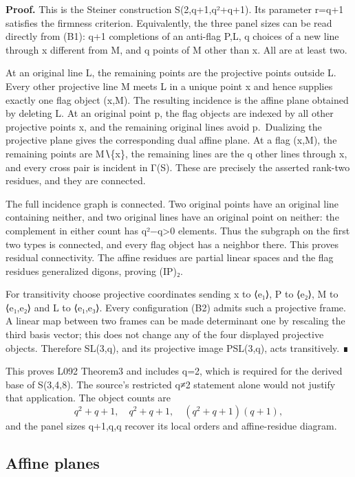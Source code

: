 \textbf{Proof.} This is the Steiner construction S(2,q+1,q²+q+1). Its
parameter r=q+1 satisfies the firmness criterion. Equivalently, the
three panel sizes can be read directly from (B1): q+1 completions of an
anti-flag P,L, q choices of a new line through x different from M, and q
points of M other than x. All are at least two.

At an original line L, the remaining points are the projective points
outside L. Every other projective line M meets L in a unique point x and
hence supplies exactly one flag object (x,M). The resulting incidence is
the affine plane obtained by deleting L. At an original point p, the
flag objects are indexed by all other projective points x, and the
remaining original lines avoid p.~Dualizing the projective plane gives
the corresponding dual affine plane. At a flag (x,M), the remaining
points are M∖\{x\}, the remaining lines are the q other lines through x,
and every cross pair is incident in Γ(S). These are precisely the
asserted rank-two residues, and they are connected.

The full incidence graph is connected. Two original points have an
original line containing neither, and two original lines have an
original point on neither: the complement in either count has
q²−q\textgreater0 elements. Thus the subgraph on the first two types is
connected, and every flag object has a neighbor there. This proves
residual connectivity. The affine residues are partial linear spaces and
the flag residues generalized digons, proving (IP)₂.

For transitivity choose projective coordinates sending x to ⟨e₁⟩, P to
⟨e₂⟩, M to ⟨e₁,e₂⟩ and L to ⟨e₁,e₃⟩. Every configuration (B2) admits
such a projective frame. A linear map between two frames can be made
determinant one by rescaling the third basis vector; this does not
change any of the four displayed projective objects. Therefore SL(3,q),
and its projective image PSL(3,q), acts transitively. ∎

This proves L092 Theorem3 and includes q=2, which is required for the
derived base of S(3,4,8). The source's restricted q≠2 statement alone
would not justify that application. The object counts are \[
q^2+q+1,\quad q^2+q+1,\quad(q^2+q+1)(q+1),
\] and the panel sizes q+1,q,q recover its local orders and
affine-residue diagram.

\subsection{Affine planes}\label{affine-planes}

